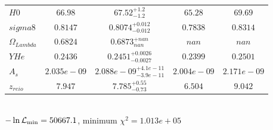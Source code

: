 \begin{tabular}{|l|c|c|c|c|}
$H0$ &$66.98$ & $67.52_{-1.2}^{+1.2}$ & $65.28$ & $69.69$ \\ 
$sigma8$ &$0.8147$ & $0.8074_{-0.012}^{+0.012}$ & $0.7838$ & $0.8314$ \\ 
$\Omega{}_{Lambda }$ &$0.6824$ & $0.6873_{nan}^{+nan}$ & $nan$ & $nan$ \\ 
$YHe$ &$0.2436$ & $0.2451_{-0.0027}^{+0.0026}$ & $0.2399$ & $0.2501$ \\ 
$A_{s }$ &$2.035e-09$ & $2.088e-09_{-3.9e-11}^{+4.1e-11}$ & $2.004e-09$ & $2.171e-09$ \\ 
$z_{reio }$ &$7.947$ & $7.785_{-0.73}^{+0.55}$ & $6.504$ & $9.042$ \\ 
\hline 
 \end{tabular} \\ 
$-\ln{\cal L}_\mathrm{min} =50667.1$, minimum $\chi^2=1.013e+05$ \\ 
